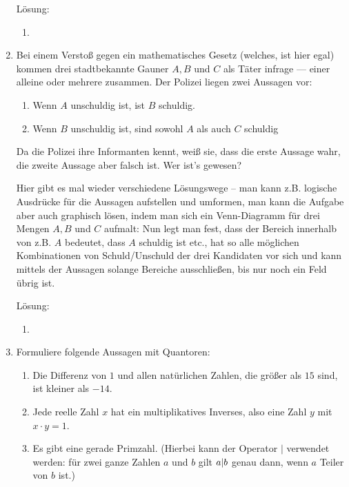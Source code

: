 \documentclass[../main.tex]{subfiles}
\begin{document}
\begin{enumerate}
	      Lösung:
	      \begin{enumerate}
		      \item
	      \end{enumerate}
	\item Bei einem Verstoß gegen ein mathematisches Gesetz (welches, ist hier egal)
	      kommen drei stadtbekannte Gauner \(
	      A, B
	      \) und \(
	      C
	      \) als Täter infrage — einer alleine oder mehrere zusammen.
	      Der Polizei liegen zwei Aussagen vor:
	      \begin{enumerate}
		      \item Wenn \(
		            A
		            \) unschuldig ist, ist \(
		            B
		            \) schuldig.
		      \item Wenn \(
		            B
		            \) unschuldig ist, sind sowohl \(
		            A
		            \) als auch \(
		            C
		            \) schuldig
	      \end{enumerate}
	      Da die Polizei ihre Informanten kennt, weiß sie, dass die erste Aussage wahr,
	      die zweite Aussage aber falsch ist. Wer ist’s gewesen?

	      Hier gibt es mal wieder verschiedene Lösungswege – man kann z.B. logische Ausdrücke
	      für die Aussagen aufstellen und umformen, man kann die Aufgabe aber auch graphisch lösen,
	      indem man sich ein Venn-Diagramm für drei Mengen \(
	      A, B
	      \) und \(
	      C
	      \) aufmalt:
	      Nun legt man fest, dass der Bereich innerhalb von z.B. \(
	      A
	      \) bedeutet, dass \(
	      A
	      \) schuldig ist etc., hat so alle möglichen Kombinationen von Schuld/Unschuld
	      der drei Kandidaten vor sich und kann mittels der Aussagen solange Bereiche ausschließen,
	      bis nur noch ein Feld übrig ist.

	      Lösung:
	      \begin{enumerate}
		      \item
	      \end{enumerate}
	\item Formuliere folgende Aussagen mit Quantoren:
	      \begin{enumerate}
		      \item Die Differenz von \(
		            1
		            \) und allen natürlichen Zahlen, die größer als \(
		            15
		            \) sind, ist kleiner als \(
		            -14
		            \).
		      \item Jede reelle Zahl \(
		            x
		            \) hat ein multiplikatives Inverses, also eine Zahl \(
		            y
		            \) mit \(
		            x \cdot y = 1
		            \).
		      \item Es gibt eine gerade Primzahl.
		            (Hierbei kann der Operator \(|\) verwendet werden: für zwei ganze Zahlen \(
		            a
		            \) und \(
		            b
		            \) gilt \(
		            a $|$ b
		            \) genau dann, wenn \(
		            a
		            \) Teiler von \(
		            b
		            \) ist.)
	      \end{enumerate}


\end{enumerate}
\end{document}
